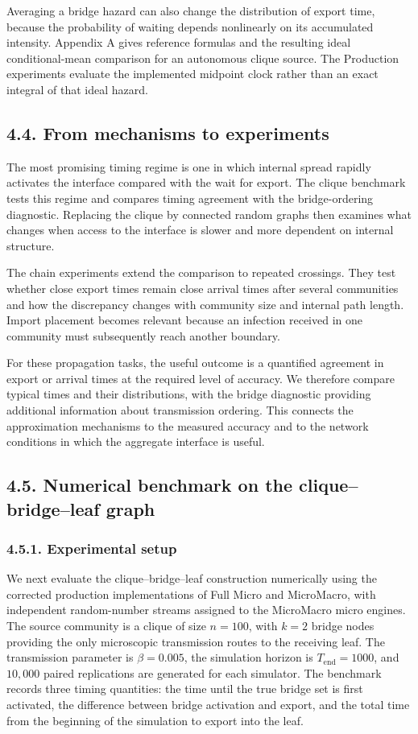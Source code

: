 \documentclass[10pt]{article}
\begin{document}
{Averaging a bridge hazard can also change the distribution of export time, because the probability of waiting depends nonlinearly on its accumulated intensity. Appendix A gives reference formulas and the resulting ideal conditional-mean comparison for an autonomous clique source. The Production experiments evaluate the implemented midpoint clock rather than an exact integral of that ideal hazard.

\subsection*{4.4. From mechanisms to experiments}
The most promising timing regime is one in which internal spread rapidly activates the interface compared with the wait for export. The clique benchmark tests this regime and compares timing agreement with the bridge-ordering diagnostic. Replacing the clique by connected random graphs then examines what changes when access to the interface is slower and more dependent on internal structure.

The chain experiments extend the comparison to repeated crossings. They test whether close export times remain close arrival times after several communities and how the discrepancy changes with community size and internal path length. Import placement becomes relevant because an infection received in one community must subsequently reach another boundary.

For these propagation tasks, the useful outcome is a quantified agreement in export or arrival times at the required level of accuracy. We therefore compare typical times and their distributions, with the bridge diagnostic providing additional information about transmission ordering. This connects the approximation mechanisms to the measured accuracy and to the network conditions in which the aggregate interface is useful.

\subsection*{4.5. Numerical benchmark on the clique--bridge--leaf graph}
\subsubsection*{4.5.1. Experimental setup}
We next evaluate the clique--bridge--leaf construction numerically using the corrected production implementations of Full Micro and MicroMacro, with independent random-number streams assigned to the MicroMacro micro engines. The source community is a clique of size $n=100$, with $k=2$ bridge nodes providing the only microscopic transmission routes to the receiving leaf. The transmission parameter is $\beta=0.005$, the simulation horizon is $T_{\mathrm{end}}=1000$, and $10{,}000$ paired replications are generated for each simulator. The benchmark records three timing quantities: the time until the true bridge set is first activated, the difference between bridge activation and export, and the total time from the beginning of the simulation to export into the leaf.

}
\end{document}
